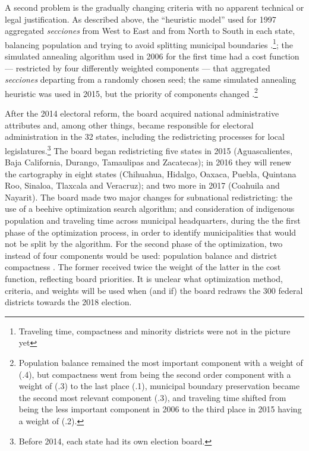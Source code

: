 \documentclass[letter,12pt]{article}
\begin{document}
A second problem is the gradually changing criteria with no apparent technical or legal justification. As described above, the ``heuristic model'' used for 1997 aggregated \emph{secciones} from West to East and from North to South in each state, balancing population and trying to avoid splitting municipal boundaries \citep{trelles.mtz.tesisItam.2007}.\footnote{Traveling time, compactness and minority districts were not in the picture yet}; the simulated annealing algorithm used in 2006 for the first time had a cost function --- restricted by four differently weighted components --- that aggregated \emph{secciones} departing from a randomly chosen seed; the same simulated annealing heuristic was used in 2015, but the priority of components changed \citep{acuerdo.ife.2004,acuerdo.ife.2013}.\footnote{Population balance remained the most important component with a weight of (.4), but compactness went from being the second order component with a weight of (.3) to the last place (.1), municipal boundary preservation became the second most relevant component (.3), and traveling time shifted from being the less important component in 2006 to the third place in 2015 having a weight of (.2).} 

After the 2014 electoral reform, the board acquired national administrative attributes and, among other things, became responsible for electoral administration in the 32 states, including the redistricting processes for local legislatures.\footnote{Before 2014, each state had its own election board.} The board began redistricting five states in 2015 (Aguascalientes, Baja California, Durango, Tamaulipas and Zacatecas); in 2016 they will renew the cartography in eight states (Chihuahua, Hidalgo, Oaxaca, Puebla, Quintana Roo, Sinaloa, Tlaxcala and Veracruz); and two more in 2017 (Coahuila and Nayarit). The board made two major changes for subnational redistricting: the use of a beehive optimization search algorithm; and consideration of indigenous population and traveling time across municipal headquarters, during the the first phase of the optimization process, in order to identify municipalities that would not be split by the algorithm. For the second phase of the optimization, two instead of four components would be used: population balance and district compactness \citep{ine.modelo.2015}. The former received twice the weight of the latter in the cost function, reflecting board priorities. It is unclear what optimization method, criteria, and weights will be used when (and if) the board redraws the 300 federal districts towards the 2018 election. 
\end{document}
